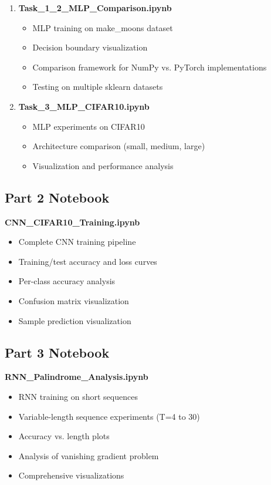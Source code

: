 \documentclass[11pt,a4paper]{article}
\begin{document}
\begin{enumerate}
    \item \textbf{Task\_1\_2\_MLP\_Comparison.ipynb}
    \begin{itemize}
        \item MLP training on make\_moons dataset
        \item Decision boundary visualization
        \item Comparison framework for NumPy vs. PyTorch implementations
        \item Testing on multiple sklearn datasets
    \end{itemize}
    
    \item \textbf{Task\_3\_MLP\_CIFAR10.ipynb}
    \begin{itemize}
        \item MLP experiments on CIFAR10
        \item Architecture comparison (small, medium, large)
        \item Visualization and performance analysis
    \end{itemize}
\end{enumerate}

\subsection{Part 2 Notebook}

\textbf{CNN\_CIFAR10\_Training.ipynb}
\begin{itemize}
    \item Complete CNN training pipeline
    \item Training/test accuracy and loss curves
    \item Per-class accuracy analysis
    \item Confusion matrix visualization
    \item Sample prediction visualization
\end{itemize}

\subsection{Part 3 Notebook}

\textbf{RNN\_Palindrome\_Analysis.ipynb}
\begin{itemize}
    \item RNN training on short sequences
    \item Variable-length sequence experiments (T=4 to 30)
    \item Accuracy vs. length plots
    \item Analysis of vanishing gradient problem
    \item Comprehensive visualizations
\end{itemize}
\end{document}

